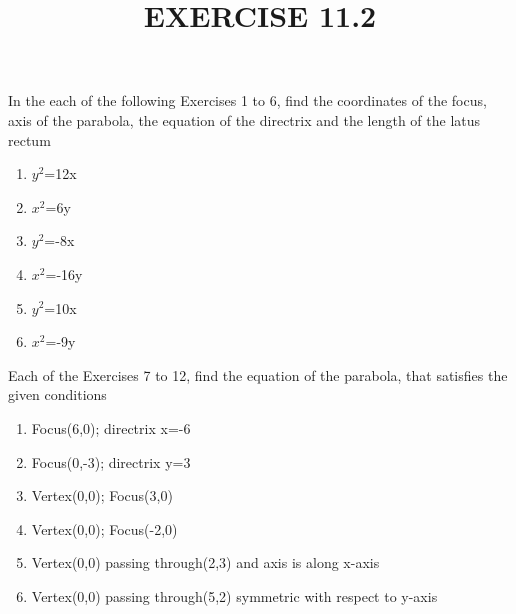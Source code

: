 \documentclass[12pt]{article}
\begin{document}
\begin{center}
\title{\textbf{EXERCISE 11.2}}
\date{\vspace{-5ex}} %
\maketitle
\end{center}

\setcounter{page}{1}

In the each of the following Exercises 1 to 6, find the coordinates of the focus, axis of the parabola, the equation of the directrix and the length of the latus rectum

\begin{enumerate}
\item $y^2$=12x 

\item $x^2$=6y 
\
\item $y^2$=-8x

\item $x^2$=-16y

\item $y^2$=10x  

\item $x^2$=-9y  
\end{enumerate}

Each of the Exercises 7 to 12, find the equation of the parabola, that satisfies the given conditions

\begin{enumerate}[resume]
\item Focus(6,0); directrix x=-6 
\item Focus(0,-3); directrix y=3
\item Vertex(0,0); Focus(3,0)
\item Vertex(0,0); Focus(-2,0) 
\item Vertex(0,0) passing through(2,3) and axis is along x-axis
\item Vertex(0,0) passing through(5,2) symmetric with respect to y-axis
\end{enumerate}
\end{document}
